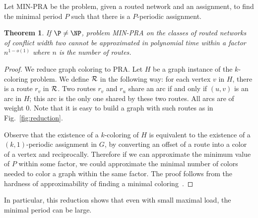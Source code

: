 \documentclass[10pt, conference, letterpaper]{IEEEtran}
\newtheorem{theorem}{Theorem}
\begin{document}
Let MIN-PRA be the problem, given a routed network and an assignment, to find the minimal period $P$ such that there is a $P$-periodic assignment. 

\begin{theorem}\label{th:inapprox}
If $\P \neq \NP$, problem MIN-PRA on the classes of routed networks of conflict width two cannot be approximated in polynomial time within a factor $n^{1-o(1)}$ where $n$ is the number of routes.
\end{theorem}

\begin{proof}
 We reduce graph coloring to PRA. Let $H$ be a graph instance of the $k$-coloring problem. 
 We define ${\cal R}$ in the following way: for each vertex $v$ in $H$, there is a route $r_v$ in ${\cal R}$.
 Two routes $r_v$ and $r_u$ share an arc if and only if $(u,v)$ is an arc in $H$; this arc is the only one shared by these two routes. All arcs are of weight $0$. Note that it is easy to build a graph with such routes as in Fig.~\ref{fig:reduction}.

 Observe that the existence of a $k$-coloring of $H$ is equivalent to the existence of a $(k,1)$-periodic assignment in $G$, 
 by converting an offset of a route into a color of a vertex and reciprocally. Therefore if we can approximate the minimum value of $P$ within some factor, we could approximate the minimal number of colors needed to color a graph within the same factor. The proof follows from the hardness of approximability of finding a minimal coloring~\cite{zuckerman2006linear}.
\end{proof}


In particular, this reduction shows that even with small maximal load, the minimal period can be large.
\end{document}
